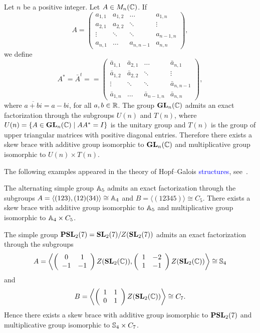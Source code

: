 \begin{example}
  \label{exa:QR}
  Let $n$ be a positive integer.  Let $A\in M_n(\mathbb{C})$. If 
  \[A=\left(\begin{array}{cccc}
  a_{1,1}&a_{1,2}&\ldots &a_{1,n}\\
  a_{2,1}&a_{2,2}&\ddots&\vdots\\
  \vdots&\ddots&\ddots&a_{n-1,n}\\
  a_{n,1}&\ldots&a_{n,n-1}&a_{n,n}\end{array}\right),\]
  we define
  \[A^*=\bar{A}^t= =\left(\begin{array}{cccc}
  \bar a_{1,1}&\bar a_{2,1}&\ldots &\bar a_{n,1}\\
  \bar a_{1,2}&\bar a_{2,2}&\ddots&\vdots\\
  \vdots&\ddots&\ddots&\bar a_{n,n-1}\\
  \bar a_{1,n}&\ldots&\bar a_{n-1,n}&\bar a_{n,n}\end{array}\right),\]
  where $\overline{a+bi}=a-bi$, for all $a,b\in\mathbb{R}$.
  The group $\mathbf{GL}_n(\mathbb{C})$ admits an
  exact factorization through the subgroups $U(n)$ and $T(n)$, where $U(n)=\{ A\in\mathbf{GL}_n(\mathbb{C})\mid AA^*=I\}$
  is the unitary group and $T(n)$ is the group of upper triangular matrices
  with positive diagonal entries.  Therefore there exists a skew brace with additive group 
  isomorphic to $\mathbf{GL}_n(\mathbb{C})$ and multiplicative group isomorphic to $U(n)\times T(n)$.  
\end{example}

The following examples appeared in the theory of 
Hopf--Galois \textcolor{blue}{structures}, see~\cite[Corollary 1.1]{MR3425626}.

\begin{example} 
	\label{exa:a5a4c5}
	The alternating simple group $\mathbb{A}_5$ admits an exact factorization
  through the subgroups 
  $A=\langle (123),(12)(34)\rangle\cong\mathbb{A}_4$ and 
  $B=\langle(12345)\rangle\cong C_5$.  
  There exists a skew brace with additive group isomorphic to $\mathbb{A}_5$ and multiplicative
  group isomorphic to $\mathbb{A}_4\times C_5$. 
\end{example}

\begin{example} 
	\label{exa:PSL27S4C7}
  The simple group $\mathbf{PSL}_2(7)=\mathbf{SL}_2(7)/Z(\mathbf{SL}_2(7))$ admits an exact factorization through the subgroups \[A=\left\langle\left(\begin{array}{cc}
  0&1\\
  -1&-1\end{array}\right)Z(\mathbf{SL}_2(\mathbb{C})),\left(\begin{array}{cc}
  1&-2\\
  1&-1\end{array}\right)Z(\mathbf{SL}_2(\mathbb{C}))\right\rangle\cong\mathbb{S}_4\] and \[B=\left\langle\left(\begin{array}{cc}
  1&1\\
  0&1\end{array}\right)Z(\mathbf{SL}_2(\mathbb{C}))\right\rangle\cong C_7.\] 
  Hence there exists a skew brace with additive
  group isomorphic to $\mathbf{PSL}_2(7)$ and multiplicative group isomorphic to 
  $\mathbb{S}_4\times C_7$.  
\end{example}

